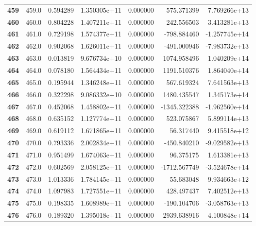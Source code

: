 \documentclass{report}[12pt]
\begin{document}
\begin{center}
\begin{tabular}{lrrrrrr}
\textbf{459 } &          459.0 &   0.594289 &  1.350305e+11 &    0.000000 &   575.371399 &  7.769266e+13 \\
\textbf{460 } &          460.0 &   0.804228 &  1.407211e+11 &    0.000000 &   242.556503 &  3.413281e+13 \\
\textbf{461 } &          461.0 &   0.729198 &  1.574377e+11 &    0.000000 &  -798.884460 & -1.257745e+14 \\
\textbf{462 } &          462.0 &   0.902068 &  1.626011e+11 &    0.000000 &  -491.000946 & -7.983732e+13 \\
\textbf{463 } &          463.0 &   0.013819 &  9.676734e+10 &    0.000000 &  1074.958496 &  1.040209e+14 \\
\textbf{464 } &          464.0 &   0.078180 &  1.564434e+11 &    0.000000 &  1191.510376 &  1.864040e+14 \\
\textbf{465 } &          465.0 &   0.195944 &  1.346248e+11 &    0.000000 &   567.619324 &  7.641563e+13 \\
\textbf{466 } &          466.0 &   0.322298 &  9.086332e+10 &    0.000000 &  1480.435547 &  1.345173e+14 \\
\textbf{467 } &          467.0 &   0.452068 &  1.458802e+11 &    0.000000 & -1345.322388 & -1.962560e+14 \\
\textbf{468 } &          468.0 &   0.635152 &  1.127774e+11 &    0.000000 &   523.075867 &  5.899114e+13 \\
\textbf{469 } &          469.0 &   0.619112 &  1.671865e+11 &    0.000000 &    56.317440 &  9.415518e+12 \\
\textbf{470 } &          470.0 &   0.793336 &  2.002834e+11 &    0.000000 &  -450.840210 & -9.029582e+13 \\
\textbf{471 } &          471.0 &   0.951499 &  1.674063e+11 &    0.000000 &    96.375175 &  1.613381e+13 \\
\textbf{472 } &          472.0 &   0.602569 &  2.058125e+11 &    0.000000 & -1712.567749 & -3.524678e+14 \\
\textbf{473 } &          473.0 &   1.013336 &  1.784145e+11 &    0.000000 &    55.683048 &  9.934663e+12 \\
\textbf{474 } &          474.0 &   1.097983 &  1.727551e+11 &    0.000000 &   428.497437 &  7.402512e+13 \\
\textbf{475 } &          475.0 &   0.198335 &  1.608989e+11 &    0.000000 &  -190.104706 & -3.058763e+13 \\
\textbf{476 } &          476.0 &   0.189320 &  1.395018e+11 &    0.000000 &  2939.638916 &  4.100848e+14 \\

\end{tabular}
\end{center}
\end{document}
